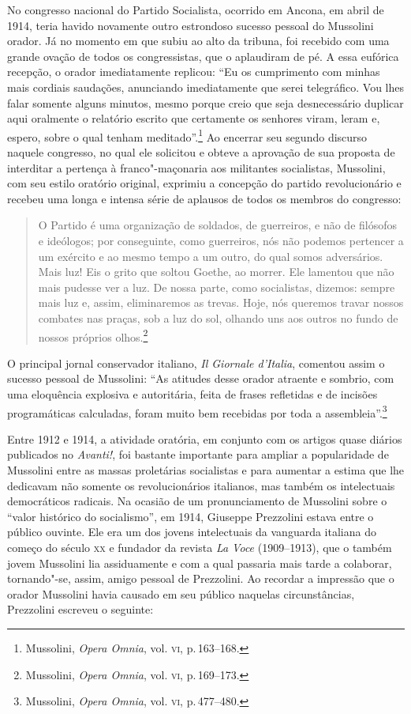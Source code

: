 No congresso nacional do Partido Socialista, ocorrido em Ancona, em
abril de 1914, teria havido novamente outro estrondoso sucesso pessoal
do Mussolini orador. Já no momento em que subiu ao alto da tribuna, foi
recebido com uma grande ovação de todos os congressistas, que o
aplaudiram de pé. A essa eufórica recepção, o orador imediatamente
replicou: ``Eu os cumprimento com minhas mais cordiais saudações,
anunciando imediatamente que serei telegráfico. Vou lhes falar somente
alguns minutos, mesmo porque creio que seja desnecessário duplicar aqui
oralmente o relatório escrito que certamente os senhores viram, leram e,
espero, sobre o qual tenham meditado''.\footnote{Mussolini, \emph{Opera
  Omnia}, vol. \textsc{vi}, p.\,163--168.} Ao encerrar seu segundo discurso
naquele congresso, no qual ele solicitou e obteve a aprovação de sua
proposta de interditar a pertença à franco"-maçonaria aos militantes
socialistas, Mussolini, com seu estilo oratório original, exprimiu a
concepção do partido revolucionário e recebeu uma longa e intensa série
de aplausos de todos os membros do congresso:

\begin{quote}
O Partido é uma organização de soldados, de guerreiros, e não de
filósofos e ideólogos; por conseguinte, como guerreiros, nós não podemos
pertencer a um exército e ao mesmo tempo a um outro, do qual somos
adversários. Mais luz! Eis o grito que soltou Goethe, ao morrer. Ele
lamentou que não mais pudesse ver a luz. De nossa parte, como
socialistas, dizemos: sempre mais luz e, assim, eliminaremos as trevas.
Hoje, nós queremos travar nossos combates nas praças, sob a luz do sol,
olhando uns aos outros no fundo de nossos próprios olhos.\footnote{Mussolini,
  \emph{Opera Omnia}, vol. \textsc{vi}, p.\,169--173.}
\end{quote}

O principal jornal conservador italiano, \emph{Il Giornale d'Italia},
comentou assim o sucesso pessoal de Mussolini: ``As atitudes desse
orador atraente e sombrio, com uma eloquência explosiva e autoritária,
feita de frases refletidas e de incisões programáticas calculadas, foram
muito bem recebidas por toda a assembleia''.\footnote{Mussolini,
  \emph{Opera Omnia}, vol. \textsc{vi}, p.\,477--480.}

Entre 1912 e 1914, a atividade oratória, em conjunto com os artigos
quase diários publicados no \emph{Avanti!}, foi bastante importante para
ampliar a popularidade de Mussolini entre as massas proletárias
socialistas e para aumentar a estima que lhe dedicavam não somente os
revolucionários italianos, mas também os intelectuais democráticos
radicais. Na ocasião de um pronunciamento de Mussolini sobre o ``valor
histórico do socialismo'', em 1914, Giuseppe Prezzolini estava entre o
público ouvinte. Ele era um dos jovens intelectuais da vanguarda
italiana do começo do século \textsc{xx} e fundador da revista \emph{La Voce}
(1909--1913), que o também jovem Mussolini lia assiduamente e com a qual
passaria mais tarde a colaborar, tornando"-se, assim, amigo pessoal de
Prezzolini. Ao recordar a impressão que o orador Mussolini havia causado
em seu público naquelas circunstâncias, Prezzolini escreveu o seguinte:

